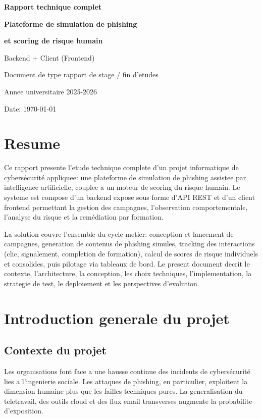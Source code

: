 \documentclass[12pt,a4paper,oneside]{report}
\begin{document}
\begin{titlepage}
  \centering
  {\Large\bfseries Rapport technique complet\par}
  \vspace{1cm}
  {\Huge\bfseries Plateforme de simulation de phishing\par}
  {\Huge\bfseries et scoring de risque humain\par}
  \vspace{1.2cm}
  {\Large Backend + Client (Frontend)\par}
  \vspace{1.5cm}
  {\large Document de type rapport de stage / fin d'etudes\par}
  \vfill
  {\large Annee universitaire 2025-2026\par}
  {\large Date: \today\par}
\end{titlepage}

\tableofcontents
\listoftables
\clearpage

\chapter*{Resume}
Ce rapport presente l'etude technique complete d'un projet informatique de cybersécurité appliquee: une plateforme de simulation de phishing assistee par intelligence artificielle, couplee a un moteur de scoring du risque humain. Le systeme est compose d'un backend expose sous forme d'API REST et d'un client frontend permettant la gestion des campagnes, l'observation comportementale, l'analyse du risque et la remédiation par formation.

La solution couvre l'ensemble du cycle metier: conception et lancement de campagnes, generation de contenus de phishing simules, tracking des interactions (clic, signalement, completion de formation), calcul de scores de risque individuels et consolides, puis pilotage via tableaux de bord. Le present document decrit le contexte, l'architecture, la conception, les choix techniques, l'implementation, la strategie de test, le deploiement et les perspectives d'evolution.

\chapter{Introduction generale du projet}

\section{Contexte du projet}
Les organisations font face a une hausse continue des incidents de cybersécurité lies a l'ingenierie sociale. Les attaques de phishing, en particulier, exploitent la dimension humaine plus que les failles techniques pures. La generalisation du teletravail, des outils cloud et des flux email transverses augmente la probabilite d'exposition.
\end{document}
